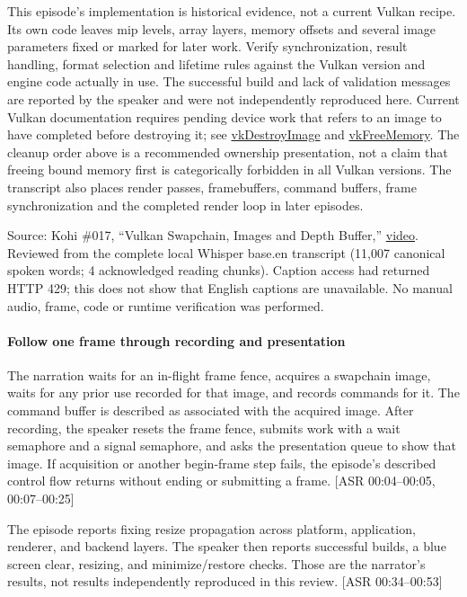 This episode's implementation is historical evidence, not a current Vulkan recipe. Its own code leaves mip levels, array layers, memory offsets and several image parameters fixed or marked for later work. Verify synchronization, result handling, format selection and lifetime rules against the Vulkan version and engine code actually in use. The successful build and lack of validation messages are reported by the speaker and were not independently reproduced here. Current Vulkan documentation requires pending device work that refers to an image to have completed before destroying it; see \href{https://docs.vulkan.org/spec/latest/chapters/resources.html}{vkDestroyImage} and \href{https://docs.vulkan.org/spec/latest/chapters/memory.html}{vkFreeMemory}. The cleanup order above is a recommended ownership presentation, not a claim that freeing bound memory first is categorically forbidden in all Vulkan versions. The transcript also places render passes, framebuffers, command buffers, frame synchronization and the completed render loop in later episodes.

Source: Kohi \#017, ``Vulkan Swapchain, Images and Depth Buffer,'' \href{https://www.youtube.com/watch?v=jWKVb_QdSNM}{video}. Reviewed from the complete local Whisper base.en transcript (11,007 canonical spoken words; 4 acknowledged reading chunks). Caption access had returned HTTP 429; this does not show that English captions are unavailable. No manual audio, frame, code or runtime verification was performed.

\paragraph{Follow one frame through recording and presentation}\label{06-engine-ii-ch026-follow-one-frame-through-recording-and-presentation}

The narration waits for an in-flight frame fence, acquires a swapchain image, waits for any prior use recorded for that image, and records commands for it. The command buffer is described as associated with the acquired image. After recording, the speaker resets the frame fence, submits work with a wait semaphore and a signal semaphore, and asks the presentation queue to show that image. If acquisition or another begin-frame step fails, the episode's described control flow returns without ending or submitting a frame. {[}ASR 00:04--00:05, 00:07--00:25{]}

The episode reports fixing resize propagation across platform, application, renderer, and backend layers. The speaker then reports successful builds, a blue screen clear, resizing, and minimize/restore checks. Those are the narrator's results, not results independently reproduced in this review. {[}ASR 00:34--00:53{]}

